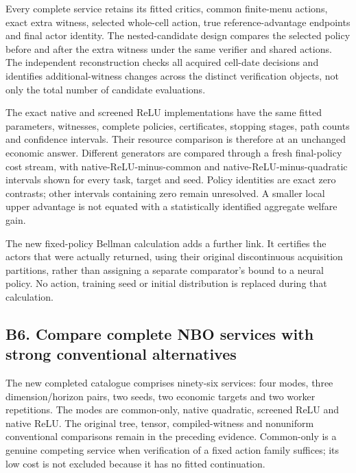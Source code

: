 Every complete service retains its fitted critics, common finite-menu
actions, exact extra witness, selected whole-cell action, true
reference-advantage endpoints and final actor identity. The
nested-candidate design compares the selected policy before and after
the extra witness under the same verifier and shared actions. The
independent reconstruction checks all acquired cell-date decisions and
identifies additional-witness changes across the distinct verification
objects, not only the total number of candidate evaluations.

The exact native and screened ReLU implementations have the same fitted
parameters, witnesses, complete policies, certificates, stopping stages,
path counts and confidence intervals. Their resource comparison is
therefore at an unchanged economic answer. Different generators are
compared through a fresh final-policy cost stream, with
native-ReLU-minus-common and native-ReLU-minus-quadratic intervals shown
for every task, target and seed. Policy identities are exact zero
contrasts; other intervals containing zero remain unresolved. A smaller
local upper advantage is not equated with a statistically identified
aggregate welfare gain.

The new fixed-policy Bellman calculation adds a further link. It
certifies the actors that were actually returned, using their original
discontinuous acquisition partitions, rather than assigning a separate
comparator's bound to a neural policy. No action, training seed or
initial distribution is replaced during that calculation.

\hypertarget{b6.-compare-complete-nbo-services-with-strong-conventional-alternatives}{%
\subsection{B6. Compare complete NBO services with strong conventional
alternatives}\label{b6.-compare-complete-nbo-services-with-strong-conventional-alternatives}}

The new completed catalogue comprises ninety-six services: four modes,
three dimension/horizon pairs, two seeds, two economic targets and two
worker repetitions. The modes are common-only, native quadratic,
screened ReLU and native ReLU. The original tree, tensor,
compiled-witness and nonuniform conventional comparisons remain in the
preceding evidence. Common-only is a genuine competing service when
verification of a fixed action family suffices; its low cost is not
excluded because it has no fitted continuation.

